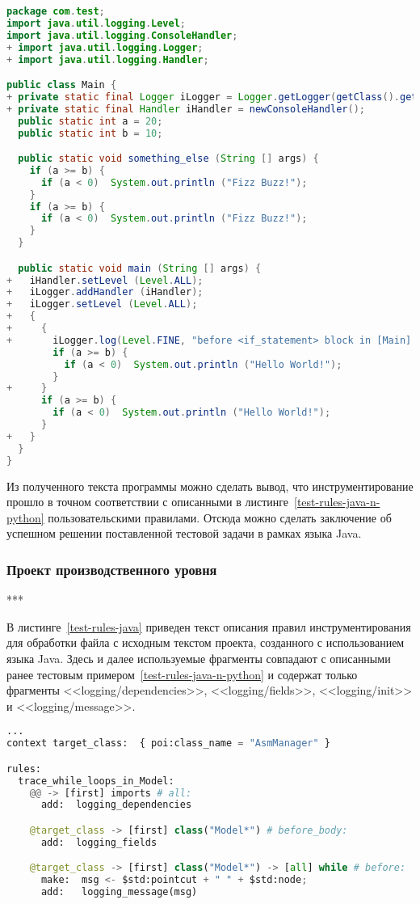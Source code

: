 \begin{lstlisting}[frame=single, language=Java, label={test-java-result}, caption={Текст инструментированного тестового приложения.}]
package com.test;
import java.util.logging.Level;
import java.util.logging.ConsoleHandler;
+ import java.util.logging.Logger;
+ import java.util.logging.Handler;

public class Main {
+ private static final Logger iLogger = Logger.getLogger(getClass().getName());
+ private static final Handler iHandler = newConsoleHandler();
  public static int a = 20;
  public static int b = 10;

  public static void something_else (String [] args) {
    if (a >= b) {
      if (a < 0)  System.out.println ("Fizz Buzz!");
    }
    if (a >= b) {
      if (a < 0)  System.out.println ("Fizz Buzz!");
    }
  }

  public static void main (String [] args) {
+   iHandler.setLevel (Level.ALL);
+   iLogger.addHandler (iHandler);
+   iLogger.setLevel (Level.ALL);
+   {
+     {
+       iLogger.log(Level.FINE, "before <if_statement> block in [Main] class, in {main} method");
        if (a >= b) {
          if (a < 0)  System.out.println ("Hello World!");
        }
+     }
      if (a >= b) {
        if (a < 0)  System.out.println ("Hello World!");
      }
+   }
  }
}
\end{lstlisting}

Из полученного текста программы можно сделать вывод, что инструментирование прошло в точном соответствии с описанными в листинге~\ref{test-rules-java-n-python} пользовательскими правилами.
Отсюда можно сделать заключение об успешном решении поставленной тестовой задачи в рамках языка Java.

\subsubsection{Проект производственного уровня}

***

В листинге~\ref{test-rules-java} приведен текст описания правил инструментирования для обработки файла с исходным текстом проекта, созданного с использованием языка Java.
Здесь и далее используемые фрагменты совпадают с описанными ранее тестовым примером~\ref{test-rules-java-n-python} и содержат только фрагменты <<logging/dependencies>>, <<logging/fields>>, <<logging/init>> и <<logging/message>>.

\begin{lstlisting}[frame=single, language=Python, label={test-rules-java}, caption={Описание правил инструментирования. Java-проект.}]
...
context target_class:  { poi:class_name = "AsmManager" }

rules:
  trace_while_loops_in_Model:
    @@ -> [first] imports # all:
      add:  logging_dependencies

    @target_class -> [first] class("Model*") # before_body:
      add:  logging_fields

    @target_class -> [first] class("Model*") -> [all] while # before:
      make:  msg <- $std:pointcut + " " + $std:node;
      add:   logging_message(msg)
\end{lstlisting}

